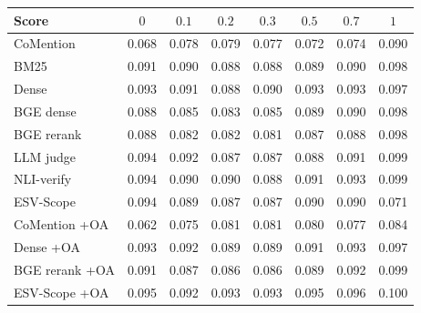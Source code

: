 \setlength{\tabcolsep}{2.5pt}
\begin{tabular}{lccccccc}
\toprule
Score & $0$ & $0.1$ & $0.2$ & $0.3$ & $0.5$ & $0.7$ & $1$ \\
\midrule
CoMention & 0.068 & 0.078 & 0.079 & 0.077 & 0.072 & 0.074 & 0.090 \\
BM25 & 0.091 & 0.090 & 0.088 & 0.088 & 0.089 & 0.090 & 0.098 \\
Dense & 0.093 & 0.091 & 0.088 & 0.090 & 0.093 & 0.093 & 0.097 \\
BGE dense & 0.088 & 0.085 & 0.083 & 0.085 & 0.089 & 0.090 & 0.098 \\
BGE rerank & 0.088 & 0.082 & 0.082 & 0.081 & 0.087 & 0.088 & 0.098 \\
LLM judge & 0.094 & 0.092 & 0.087 & 0.087 & 0.088 & 0.091 & 0.099 \\
NLI-verify & 0.094 & 0.090 & 0.090 & 0.088 & 0.091 & 0.093 & 0.099 \\
ESV-Scope & 0.094 & 0.089 & 0.087 & 0.087 & 0.090 & 0.090 & 0.071 \\
\midrule
CoMention +OA & 0.062 & 0.075 & 0.081 & 0.081 & 0.080 & 0.077 & 0.084 \\
Dense +OA & 0.093 & 0.092 & 0.089 & 0.089 & 0.091 & 0.093 & 0.097 \\
BGE rerank +OA & 0.091 & 0.087 & 0.086 & 0.086 & 0.089 & 0.092 & 0.099 \\
ESV-Scope +OA & 0.095 & 0.092 & 0.093 & 0.093 & 0.095 & 0.096 & 0.100 \\
\bottomrule
\end{tabular}
